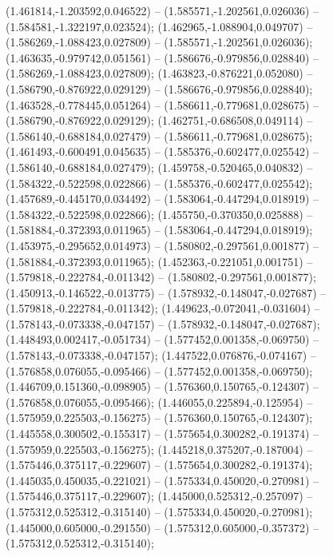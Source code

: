  (1.461814,-1.203592,0.046522) -- (1.585571,-1.202561,0.026036) -- (1.584581,-1.322197,0.023524);
 (1.462965,-1.088904,0.049707) -- (1.586269,-1.088423,0.027809) -- (1.585571,-1.202561,0.026036);
 (1.463635,-0.979742,0.051561) -- (1.586676,-0.979856,0.028840) -- (1.586269,-1.088423,0.027809);
 (1.463823,-0.876221,0.052080) -- (1.586790,-0.876922,0.029129) -- (1.586676,-0.979856,0.028840);
 (1.463528,-0.778445,0.051264) -- (1.586611,-0.779681,0.028675) -- (1.586790,-0.876922,0.029129);
 (1.462751,-0.686508,0.049114) -- (1.586140,-0.688184,0.027479) -- (1.586611,-0.779681,0.028675);
 (1.461493,-0.600491,0.045635) -- (1.585376,-0.602477,0.025542) -- (1.586140,-0.688184,0.027479);
 (1.459758,-0.520465,0.040832) -- (1.584322,-0.522598,0.022866) -- (1.585376,-0.602477,0.025542);
 (1.457689,-0.445170,0.034492) -- (1.583064,-0.447294,0.018919) -- (1.584322,-0.522598,0.022866);
 (1.455750,-0.370350,0.025888) -- (1.581884,-0.372393,0.011965) -- (1.583064,-0.447294,0.018919);
 (1.453975,-0.295652,0.014973) -- (1.580802,-0.297561,0.001877) -- (1.581884,-0.372393,0.011965);
 (1.452363,-0.221051,0.001751) -- (1.579818,-0.222784,-0.011342) -- (1.580802,-0.297561,0.001877);
 (1.450913,-0.146522,-0.013775) -- (1.578932,-0.148047,-0.027687) -- (1.579818,-0.222784,-0.011342);
 (1.449623,-0.072041,-0.031604) -- (1.578143,-0.073338,-0.047157) -- (1.578932,-0.148047,-0.027687);
 (1.448493,0.002417,-0.051734) -- (1.577452,0.001358,-0.069750) -- (1.578143,-0.073338,-0.047157);
 (1.447522,0.076876,-0.074167) -- (1.576858,0.076055,-0.095466) -- (1.577452,0.001358,-0.069750);
 (1.446709,0.151360,-0.098905) -- (1.576360,0.150765,-0.124307) -- (1.576858,0.076055,-0.095466);
 (1.446055,0.225894,-0.125954) -- (1.575959,0.225503,-0.156275) -- (1.576360,0.150765,-0.124307);
 (1.445558,0.300502,-0.155317) -- (1.575654,0.300282,-0.191374) -- (1.575959,0.225503,-0.156275);
 (1.445218,0.375207,-0.187004) -- (1.575446,0.375117,-0.229607) -- (1.575654,0.300282,-0.191374);
 (1.445035,0.450035,-0.221021) -- (1.575334,0.450020,-0.270981) -- (1.575446,0.375117,-0.229607);
 (1.445000,0.525312,-0.257097) -- (1.575312,0.525312,-0.315140) -- (1.575334,0.450020,-0.270981);
 (1.445000,0.605000,-0.291550) -- (1.575312,0.605000,-0.357372) -- (1.575312,0.525312,-0.315140);
